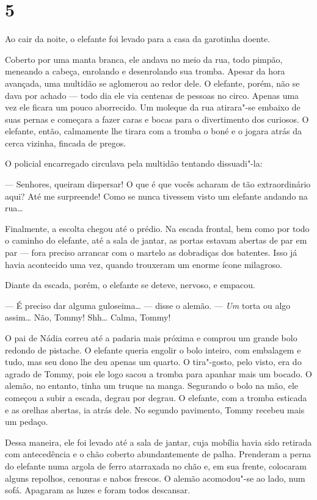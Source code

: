 \section{5}

Ao cair da noite, o elefante foi levado para a casa da garotinha doente.

Coberto por uma manta branca, ele andava no meio da rua, todo pimpão,
meneando a cabeça, enrolando e desenrolando sua tromba. Apesar da hora
avançada, uma multidão se aglomerou ao redor dele. O elefante, porém,
não se dava por achado --- todo dia ele via centenas de pessoas no
circo. Apenas uma vez ele ficara um pouco aborrecido. Um moleque da rua
atirara"-se embaixo de suas pernas e começara a fazer caras e bocas para
o divertimento dos curiosos. O elefante, então, calmamente lhe tirara
com a tromba o boné e o jogara atrás da cerca vizinha, fincada de
pregos.

O policial encarregado circulava pela multidão tentando dissuadi"-la:

--- Senhores, queiram dispersar! O que é que vocês acharam de tão
extraordinário aqui? Até me surpreende! Como se nunca tivessem visto um
elefante andando na rua\ldots{}

Finalmente, a escolta chegou até o prédio. Na escada frontal, bem como
por todo o caminho do elefante, até a sala de jantar, as portas estavam
abertas de par em par --- fora preciso arrancar com o martelo as
dobradiças dos batentes. Isso já havia acontecido uma vez, quando
trouxeram um enorme ícone milagroso.

Diante da escada, porém, o elefante se deteve, nervoso, e empacou.

--- É preciso dar alguma guloseima\ldots{} --- disse o alemão. --- \emph{Um}
torta ou algo assim\ldots{} Não, Tommy! Shh\ldots{} Calma, Tommy!

O pai de Nádia correu até a padaria mais próxima e comprou um grande
bolo redondo de pistache. O elefante queria engolir o bolo inteiro, com
embalagem e tudo, mas seu dono lhe deu apenas um quarto. O tira"-gosto,
pelo visto, era do agrado de Tommy, pois ele logo sacou a tromba para
apanhar mais um bocado. O alemão, no entanto, tinha um truque na manga.
Segurando o bolo na mão, ele começou a subir a escada, degrau por
degrau. O elefante, com a tromba esticada e as orelhas abertas, ia atrás
dele. No segundo pavimento, Tommy recebeu mais um pedaço.

Dessa maneira, ele foi levado até a sala de jantar, cuja mobília havia sido retirada com antecedência e o chão coberto abundantemente de palha. Prenderam a perna do elefante numa argola de ferro
atarraxada no chão e, em sua frente, colocaram alguns repolhos, cenouras
e nabos frescos. O alemão acomodou"-se ao lado, num sofá. Apagaram as
luzes e foram todos descansar.

